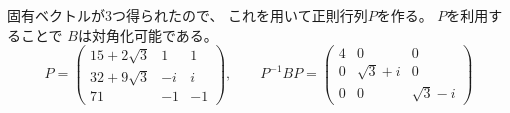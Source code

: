 \documentclass[12pt,b5paper]{ltjsarticle}
\begin{document}
\begin{enumerate}
      固有ベクトルが3つ得られたので、
      これを用いて正則行列$P$を作る。
      $P$を利用することで
      $B$は対角化可能である。
      \begin{equation}
       P=
        \begin{pmatrix}
         15+2\sqrt{3} & 1 & 1 \\
         32+9\sqrt{3} & -i & i \\
         71 & -1 & -1
        \end{pmatrix}
      ,\qquad
      P^{-1}BP =
        \begin{pmatrix}
         4 & 0 & 0 \\
         0 & \sqrt{3}+i & 0 \\
         0 & 0 & \sqrt{3}-i
        \end{pmatrix}
      \end{equation}


\end{enumerate}
\end{document}
